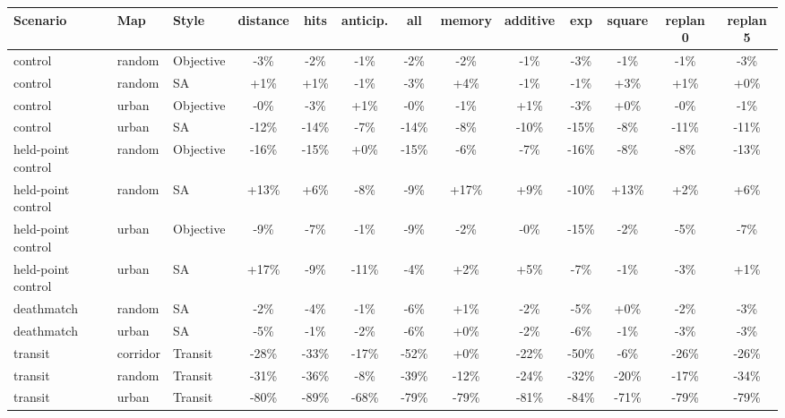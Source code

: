 \begin{tabular}{lll|ccc|cc|ccc|cc}
\toprule
Scenario & Map & Style & distance & hits & anticip. & all & memory & additive & exp & square & replan 0 & replan 5 \\
\midrule
control & random & Objective & -3\% & -2\% & -1\% & -2\% & -2\% & -1\% & -3\% & -1\% & -1\% & -3\% \\
control & random & SA & +1\% & +1\% & -1\% & -3\% & +4\% & -1\% & -1\% & +3\% & +1\% & +0\% \\
control & urban & Objective & -0\% & -3\% & +1\% & -0\% & -1\% & +1\% & -3\% & +0\% & -0\% & -1\% \\
control & urban & SA & -12\% & -14\% & -7\% & -14\% & -8\% & -10\% & -15\% & -8\% & -11\% & -11\% \\
held-point control & random & Objective & -16\% & -15\% & +0\% & -15\% & -6\% & -7\% & -16\% & -8\% & -8\% & -13\% \\
held-point control & random & SA & +13\% & +6\% & -8\% & -9\% & +17\% & +9\% & -10\% & +13\% & +2\% & +6\% \\
held-point control & urban & Objective & -9\% & -7\% & -1\% & -9\% & -2\% & -0\% & -15\% & -2\% & -5\% & -7\% \\
held-point control & urban & SA & +17\% & -9\% & -11\% & -4\% & +2\% & +5\% & -7\% & -1\% & -3\% & +1\% \\
deathmatch & random & SA & -2\% & -4\% & -1\% & -6\% & +1\% & -2\% & -5\% & +0\% & -2\% & -3\% \\
deathmatch & urban & SA & -5\% & -1\% & -2\% & -6\% & +0\% & -2\% & -6\% & -1\% & -3\% & -3\% \\
transit & corridor & Transit & -28\% & -33\% & -17\% & -52\% & +0\% & -22\% & -50\% & -6\% & -26\% & -26\% \\
transit & random & Transit & -31\% & -36\% & -8\% & -39\% & -12\% & -24\% & -32\% & -20\% & -17\% & -34\% \\
transit & urban & Transit & -80\% & -89\% & -68\% & -79\% & -79\% & -81\% & -84\% & -71\% & -79\% & -79\% \\
\bottomrule
\end{tabular}
